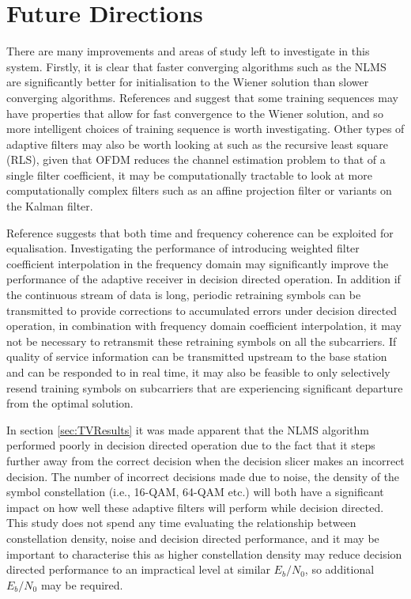 \section{Future Directions}

There are many improvements and areas of study left to %
investigate in this system. Firstly, it is clear that faster %
converging algorithms such as the NLMS are significantly %
better for initialisation to the Wiener solution than slower %
converging algorithms. References \cite{Qureshi77} and %
\cite{Crozier91} suggest that some training sequences %
may have properties that allow for fast convergence %
to the Wiener solution, and so more intelligent choices of %
training sequence is worth investigating. Other types of %
adaptive filters may also be worth looking at such %
as the recursive least square (RLS), given that %
OFDM reduces the channel estimation problem to that %
of a single filter coefficient, it may be computationally %
tractable to look at more computationally complex filters %
such as an affine projection filter or variants on the Kalman %
filter. 

Reference \cite{Wei17} suggests that both time and frequency %
coherence can be exploited for equalisation. Investigating %
the performance of introducing weighted filter coefficient %
interpolation in the frequency domain may significantly %
improve the performance of the adaptive receiver in decision %
directed operation. In addition if the continuous stream of data %
is long, periodic retraining symbols can be transmitted to %
provide corrections to accumulated errors under decision %
directed operation, in combination with frequency domain %
coefficient interpolation, it may not be necessary to %
retransmit these retraining symbols on all the subcarriers. If %
quality of service information can be transmitted upstream %
to the base station and can be responded to in real time, it %
may also be feasible to only selectively resend training %
symbols on subcarriers that are experiencing significant %
departure from the optimal solution. 

In section \ref{sec:TVResults} it was made apparent that the %
NLMS algorithm performed poorly in decision directed operation %
due to the fact that it steps further away from the correct %
decision when the decision slicer makes an incorrect decision. %
The number of incorrect decisions made due to noise, the density %
of the symbol constellation (i.e., 16-QAM, 64-QAM etc.) will both %
have a significant impact on how well these adaptive filters will %
perform while decision directed. This study does not spend any %
time evaluating the relationship between constellation density, %
noise and decision directed performance, and it may be %
important to characterise this as higher constellation density %
may reduce decision directed performance to an impractical %
level at similar $E_b/N_0$, so additional $E_b/N_0$ may be %
required.

